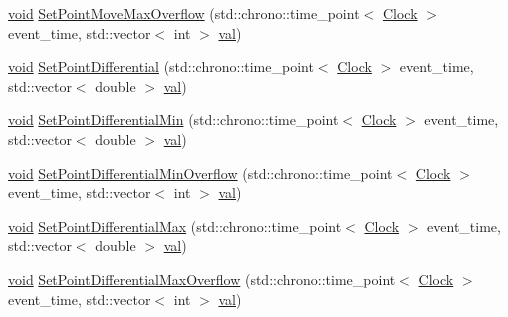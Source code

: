 \begin{DoxyCompactItemize}
\mbox{\hyperlink{glad_8h_a950fc91edb4504f62f1c577bf4727c29}{void}} \mbox{\hyperlink{class_point_a7c9776ffca2fde856fa8eaee669d9881}{Set\+Point\+Move\+Max\+Overflow}} (std\+::chrono\+::time\+\_\+point$<$ \mbox{\hyperlink{universe_8h_a0ef8d951d1ca5ab3cfaf7ab4c7a6fd80}{Clock}} $>$ event\+\_\+time, std\+::vector$<$ int $>$ \mbox{\hyperlink{glad_8h_a26942fd2ed566ef553eae82d2c109c8f}{val}})
\item 
\mbox{\hyperlink{glad_8h_a950fc91edb4504f62f1c577bf4727c29}{void}} \mbox{\hyperlink{class_point_adb977a2f01e7a2b549e1bd36fa6f5354}{Set\+Point\+Differential}} (std\+::chrono\+::time\+\_\+point$<$ \mbox{\hyperlink{universe_8h_a0ef8d951d1ca5ab3cfaf7ab4c7a6fd80}{Clock}} $>$ event\+\_\+time, std\+::vector$<$ double $>$ \mbox{\hyperlink{glad_8h_a26942fd2ed566ef553eae82d2c109c8f}{val}})
\item 
\mbox{\hyperlink{glad_8h_a950fc91edb4504f62f1c577bf4727c29}{void}} \mbox{\hyperlink{class_point_a944fcec52017ce88e052a576ef143926}{Set\+Point\+Differential\+Min}} (std\+::chrono\+::time\+\_\+point$<$ \mbox{\hyperlink{universe_8h_a0ef8d951d1ca5ab3cfaf7ab4c7a6fd80}{Clock}} $>$ event\+\_\+time, std\+::vector$<$ double $>$ \mbox{\hyperlink{glad_8h_a26942fd2ed566ef553eae82d2c109c8f}{val}})
\item 
\mbox{\hyperlink{glad_8h_a950fc91edb4504f62f1c577bf4727c29}{void}} \mbox{\hyperlink{class_point_a582e63ebdbb0979234acb460e673a393}{Set\+Point\+Differential\+Min\+Overflow}} (std\+::chrono\+::time\+\_\+point$<$ \mbox{\hyperlink{universe_8h_a0ef8d951d1ca5ab3cfaf7ab4c7a6fd80}{Clock}} $>$ event\+\_\+time, std\+::vector$<$ int $>$ \mbox{\hyperlink{glad_8h_a26942fd2ed566ef553eae82d2c109c8f}{val}})
\item 
\mbox{\hyperlink{glad_8h_a950fc91edb4504f62f1c577bf4727c29}{void}} \mbox{\hyperlink{class_point_ac2e53da4cbee0dc39c0b7a4d3e3a6ee5}{Set\+Point\+Differential\+Max}} (std\+::chrono\+::time\+\_\+point$<$ \mbox{\hyperlink{universe_8h_a0ef8d951d1ca5ab3cfaf7ab4c7a6fd80}{Clock}} $>$ event\+\_\+time, std\+::vector$<$ double $>$ \mbox{\hyperlink{glad_8h_a26942fd2ed566ef553eae82d2c109c8f}{val}})
\item 
\mbox{\hyperlink{glad_8h_a950fc91edb4504f62f1c577bf4727c29}{void}} \mbox{\hyperlink{class_point_a0b1ce0db9514762fc3aa9d57fa3034a0}{Set\+Point\+Differential\+Max\+Overflow}} (std\+::chrono\+::time\+\_\+point$<$ \mbox{\hyperlink{universe_8h_a0ef8d951d1ca5ab3cfaf7ab4c7a6fd80}{Clock}} $>$ event\+\_\+time, std\+::vector$<$ int $>$ \mbox{\hyperlink{glad_8h_a26942fd2ed566ef553eae82d2c109c8f}{val}})
\item 

\end{DoxyCompactItemize}
